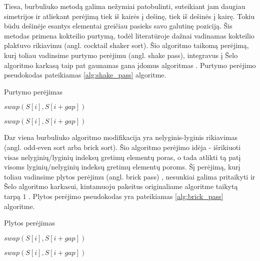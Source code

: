 \documentclass{VUMIFInfKursinis}
\begin{document}
Tiesa, burbuliuko metodą galima nežymiai patobulinti, suteikiant jam daugiau simetrijos ir atliekant perėjimą
tiek iš kairės į dešinę, tiek iš dešinės į kairę.
Tokiu būdu dešinėje esantys elementai greičiau pasieks savo galutinę poziciją.
Šis metodas primena kokteilio purtymą, todėl literatūroje dažnai vadinamas kokteilio plaktuvo rikiavimu (angl. cocktail shaker sort).
Šio algoritmo taikomą perėjimą, kurį toliau vadinsime purtymo perėjimu (angl. shake pass), integravus į Šelo algoritmo karkasą
taip pat gaunamas gana įdomus algoritmas \cite{incerpi1986practical}.
Purtymo perėjimo pseudokodas pateikiamas \ref{alg:shake_pass} algoritme.

\begin{algorithm}[H]
  \caption{Purtymo perėjimas}\label{alg:shake_pass}
  \begin{algorithmic}[1]
        \State $swap(S[i], S[i+gap])$
      \EndIf
    \EndFor

        \State $swap(S[i], S[i+gap])$
      \EndIf
    \EndFor
  \end{algorithmic}
\end{algorithm}

Dar viena burbuliuko algoritmo modifikacija yra nelyginis-lyginis rikiavimas (angl. odd-even sort arba brick sort).
Šio algoritmo perėjimo idėja - išrikiuoti visas nelyginių/lyginių indeksų gretimų elementų poras,
o tada atlikti tą patį visoms lyginių/nelyginių indeksų gretimų elementų poroms.
Šį perėjimą, kurį toliau vadinsime plytos perėjimu (angl. brick pass) \cite{sedgewick1996analysis},
nesunkiai galima pritaikyti ir Šelo algoritmo karkasui, kintamuoju pakeitus originaliame algoritme taikytą tarpą $1$ \cite{lemke1994performance}.
Plytos perėjimo pseudokodas yra pateikiamas \ref{alg:brick_pass} algoritme.

\begin{algorithm}[H]
  \caption{Plytos perėjimas}\label{alg:brick_pass}
  \begin{algorithmic}[1]
        \State $swap(S[i], S[i+gap])$
      \EndIf
    \EndFor

        \State $swap(S[i], S[i+gap])$
      \EndIf
    \EndFor
  \end{algorithmic}
\end{algorithm}
\end{document}
